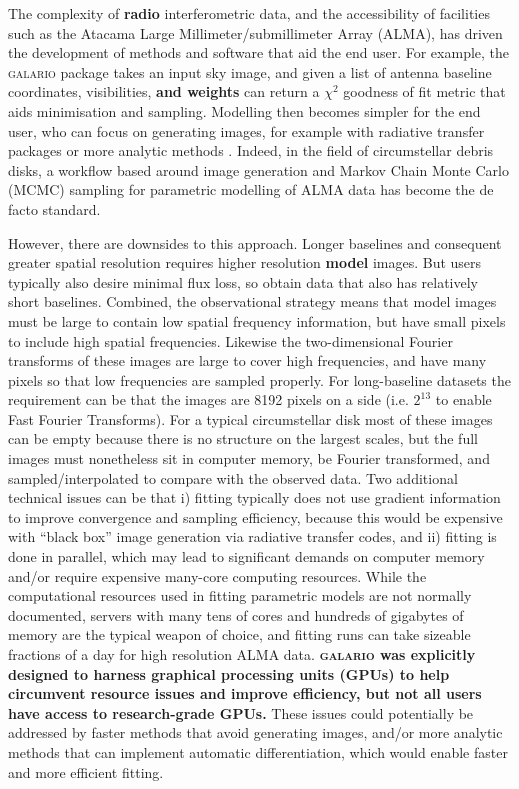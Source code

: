 \documentclass[fleqn,usenatbib]{mnras}
\begin{document}
The complexity of \textbf{radio} interferometric data, and the accessibility of facilities such as the Atacama Large Millimeter/submillimeter Array (ALMA), has driven the development of methods and software that aid the end user. For example, the \textsc{galario} package \citep{2018MNRAS.476.4527T} takes an input sky image, and given a list of antenna baseline coordinates, visibilities, \textbf{and weights} can return a $\chi^2$ goodness of fit metric that aids minimisation and sampling. Modelling then becomes simpler for the end user, who can focus on generating images, for example with radiative transfer packages \citep[e.g. RADMC,][]{2012ascl.soft02015D} or more analytic methods \citep[e.g.][]{2021MNRAS.504.4497C}. Indeed, in the field of circumstellar debris disks, a workflow based around image generation and Markov Chain Monte Carlo (MCMC) sampling for parametric modelling of ALMA data has become the de facto standard.

However, there are downsides to this approach. Longer  baselines and consequent greater spatial resolution requires higher resolution \textbf{model} images. But users typically also desire minimal flux loss, so obtain data that also has relatively short baselines.  Combined, the observational strategy means that model images must be large to contain low spatial frequency information, but have small pixels to include high spatial frequencies. Likewise the two-dimensional Fourier transforms of these images are large to cover high frequencies, and have many pixels so that low frequencies are sampled properly. For long-baseline datasets the requirement can be that the images are 8192 pixels on a side (i.e. $2^{13}$ to enable Fast Fourier Transforms). For a typical circumstellar disk most of these images can be empty because there is no structure on the largest scales, but the full images must nonetheless sit in computer memory, be Fourier transformed, and sampled/interpolated to compare with the observed data. Two additional technical issues can be that i) fitting typically does not use gradient information to improve convergence and sampling efficiency, because this would be expensive with ``black box'' image generation via radiative transfer codes, and ii) fitting is done in parallel, which may lead to significant demands on computer memory and/or require expensive many-core computing resources. While the computational resources used in fitting parametric models are not normally documented, servers with many tens of cores and hundreds of gigabytes of memory are the typical weapon of choice, and fitting runs can take sizeable fractions of a day for high resolution ALMA data. \textbf{\textsc{galario} was explicitly designed to harness graphical processing units (GPUs) to help circumvent resource issues and improve efficiency, but not all users have access to research-grade GPUs.} These issues could potentially be addressed by faster methods that avoid generating images, and/or more analytic methods that can implement automatic differentiation, which would enable faster and more efficient fitting.
\end{document}

